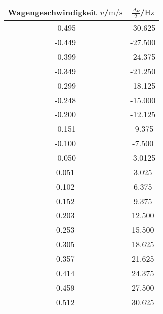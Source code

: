 \begin{table}
	\centering
	\caption{}
	\label{tab:schwebung}
	\begin{tabular}{cc}
		\toprule
		Wagengeschwindigkeit $v$/$\si{\meter\per\second}$ & $\frac{\Delta \nu}{2}$/$\si{\Hz}$ \\
		\midrule
		-0.495                                            & -30.625                           \\
		-0.449                                            & -27.500                           \\
		-0.399                                            & -24.375                           \\
		-0.349                                            & -21.250                           \\
		-0.299                                            & -18.125                           \\
		-0.248                                            & -15.000                           \\
		-0.200                                            & -12.125                           \\
		-0.151                                            & -9.375                            \\
		-0.100                                            & -7.500                            \\
		-0.050                                            & -3.0125                           \\
		0.051                                             & 3.025                             \\
		0.102                                             & 6.375                             \\
		0.152                                             & 9.375                             \\
		0.203                                             & 12.500                            \\
		0.253                                             & 15.500                            \\
		0.305                                             & 18.625                            \\
		0.357                                             & 21.625                            \\
		0.414                                             & 24.375                            \\
		0.459                                             & 27.500                            \\
		0.512                                             & 30.625                            \\
		\bottomrule
	\end{tabular}
\end{table}
